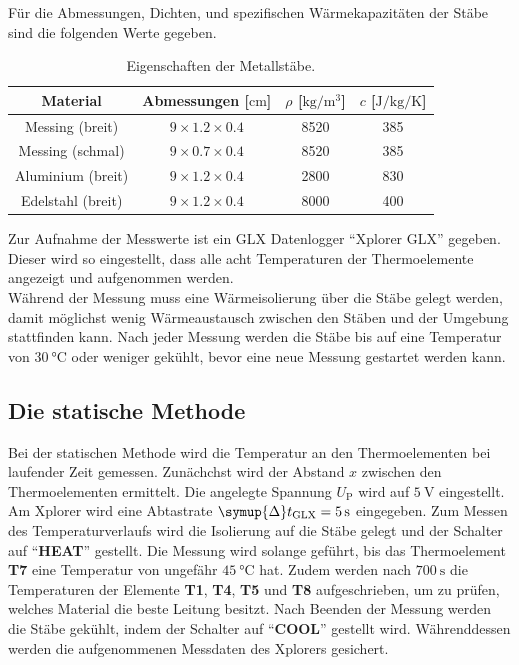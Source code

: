    Für die Abmessungen, Dichten, und spezifischen Wärmekapazitäten der Stäbe sind die folgenden Werte gegeben.
    \begin{table}
        \centering
        \caption{Eigenschaften der Metallstäbe.}
        \label{tab:vorgegebeneDaten}
        \begin{tabular}{c c c c}
            \toprule
            Material &
            Abmessungen [$\si{\centi\meter}$] &
            $\rho$ [$\si{\kilo\gram\per\cubic\meter}$] &
            $c$ [$\si{\joule\per\kilo\gram\per\kelvin}$] \\
            \midrule
            Messing (breit)   & $9 \times 1.2 \times 0.4$ & 8520 & 385 \\
            Messing (schmal)  & $9 \times 0.7 \times 0.4$ & 8520 & 385 \\
            Aluminium (breit) & $9 \times 1.2 \times 0.4$ & 2800 & 830 \\
            Edelstahl (breit) & $9 \times 1.2 \times 0.4$ & 8000 & 400 \\
            \bottomrule
        \end{tabular}
    \end{table}

    Zur Aufnahme der Messwerte ist ein GLX Datenlogger \enquote{Xplorer GLX} gegeben.
    Dieser wird so eingestellt, dass alle acht Temperaturen der Thermoelemente angezeigt und aufgenommen werden.
    \\
    Während der Messung muss eine Wärmeisolierung über die Stäbe gelegt werden,
    damit möglichst wenig Wärmeaustausch zwischen den Stäben und der Umgebung stattfinden kann.
    Nach jeder Messung werden die Stäbe bis auf eine Temperatur von $\SI{30}{\celsius}$ oder
    weniger gekühlt, bevor eine neue Messung gestartet werden kann.

\subsection{Die statische Methode}

    Bei der statischen Methode wird die Temperatur an den Thermoelementen bei
    laufender Zeit gemessen.
    Zunächchst wird der Abstand $x$ zwischen den Thermoelementen ermittelt.
    Die angelegte Spannung $U_\text{P}$ wird auf $\SI{5}{\volt}$ eingestellt.
    Am Xplorer wird eine Abtastrate $\symup{\Delta} t_\text{GLX} = \SI{5}{\second}$ eingegeben.
    Zum Messen des Temperaturverlaufs wird die Isolierung auf die Stäbe gelegt
    und der Schalter auf \enquote{\textbf{HEAT}} gestellt.
    Die Messung wird solange geführt,
    bis das Thermoelement \textbf{T7} eine Temperatur von ungefähr $\SI{45}{\celsius}$ hat.
    Zudem werden nach $\SI{700}{\second}$ die Temperaturen der Elemente \textbf{T1}, \textbf{T4}, \textbf{T5} und \textbf{T8} aufgeschrieben,
    um zu prüfen, welches Material die beste Leitung besitzt.
    Nach Beenden der Messung werden die Stäbe gekühlt,
    indem der Schalter auf \enquote{\textbf{COOL}} gestellt wird.
    Währenddessen werden die aufgenommenen Messdaten des Xplorers gesichert.

